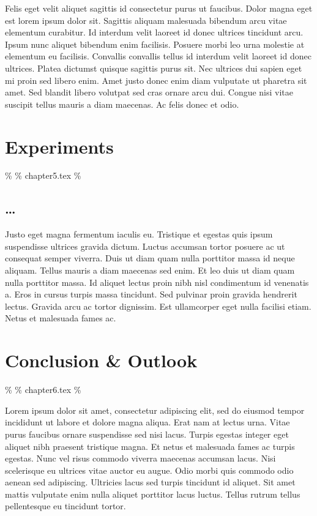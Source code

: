 \documentclass[
  BCOR=10mm, %
  DIV=12, %
  twoside, %
  headsepline, %
  listof=totoc, %
  bibliography=totoc, %
  index=totoc, %
  abstract=true, %
  numbers=noenddot, %
]{cs-thesis}
\begin{document}
    Felis eget velit aliquet sagittis id consectetur purus ut faucibus.
    Dolor magna eget est lorem ipsum dolor sit. Sagittis aliquam
    malesuada bibendum arcu vitae elementum curabitur. Id interdum velit
    laoreet id donec ultrices tincidunt arcu. Ipsum nunc aliquet
    bibendum enim facilisis. Posuere morbi leo urna molestie at
    elementum eu facilisis. Convallis convallis tellus id interdum velit
    laoreet id donec ultrices. Platea dictumst quisque sagittis purus
    sit. Nec ultrices dui sapien eget mi proin sed libero enim. Amet
    justo donec enim diam vulputate ut pharetra sit amet. Sed blandit
    libero volutpat sed cras ornare arcu dui. Congue nisi vitae suscipit
    tellus mauris a diam maecenas. Ac felis donec et odio.


    \chapter{Experiments}\label{experiments}

    \% \% chapter5.tex \%

    \section{\ldots{}}\label{section-6}

    Justo eget magna fermentum iaculis eu. Tristique et egestas quis
    ipsum suspendisse ultrices gravida dictum. Luctus accumsan tortor
    posuere ac ut consequat semper viverra. Duis ut diam quam nulla
    porttitor massa id neque aliquam. Tellus mauris a diam maecenas sed
    enim. Et leo duis ut diam quam nulla porttitor massa. Id aliquet
    lectus proin nibh nisl condimentum id venenatis a. Eros in cursus
    turpis massa tincidunt. Sed pulvinar proin gravida hendrerit lectus.
    Gravida arcu ac tortor dignissim. Est ullamcorper eget nulla
    facilisi etiam. Netus et malesuada fames ac.


    \chapter{Conclusion \& Outlook}\label{conclusion-outlook}

    \% \% chapter6.tex \%

    Lorem ipsum dolor sit amet, consectetur adipiscing elit, sed do
    eiusmod tempor incididunt ut labore et dolore magna aliqua. Erat nam
    at lectus urna. Vitae purus faucibus ornare suspendisse sed nisi
    lacus. Turpis egestas integer eget aliquet nibh praesent tristique
    magna. Et netus et malesuada fames ac turpis egestas. Nunc vel risus
    commodo viverra maecenas accumsan lacus. Nisi scelerisque eu
    ultrices vitae auctor eu augue. Odio morbi quis commodo odio aenean
    sed adipiscing. Ultricies lacus sed turpis tincidunt id aliquet. Sit
    amet mattis vulputate enim nulla aliquet porttitor lacus luctus.
    Tellus rutrum tellus pellentesque eu tincidunt tortor.
    
\end{document}
